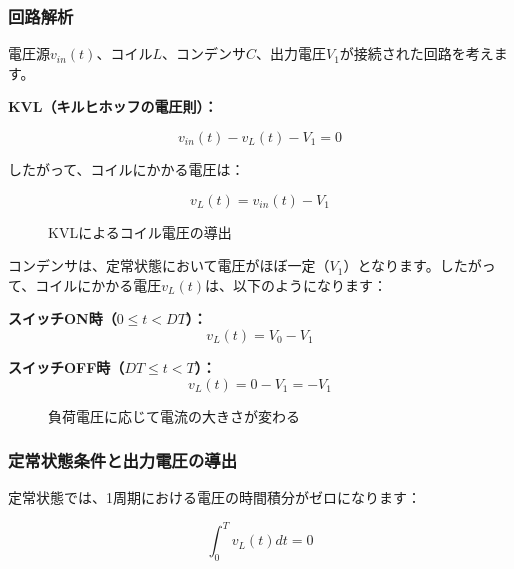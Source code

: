\subsubsection{回路解析}

電圧源$v_{in}(t)$、コイル$L$、コンデンサ$C$、出力電圧$V_1$が接続された回路を考えます。

\textbf{KVL（キルヒホッフの電圧則）：}

\begin{equation}
v_{in}(t) - v_L(t) - V_1 = 0
\end{equation}

したがって、コイルにかかる電圧は：

\begin{equation}
v_L(t) = v_{in}(t) - V_1
\end{equation}

\begin{figure}[H]
\centering
{}
\caption{KVLによるコイル電圧の導出}
\label{fig:ch04_inductor_load_kvl}
\end{figure}

コンデンサは、定常状態において電圧がほぼ一定（$V_1$）となります。したがって、コイルにかかる電圧$v_L(t)$は、以下のようになります：

\textbf{スイッチON時（$0 \leq t < DT$）：}
\begin{equation}
v_L(t) = V_0 - V_1
\end{equation}

\textbf{スイッチOFF時（$DT \leq t < T$）：}
\begin{equation}
v_L(t) = 0 - V_1 = -V_1
\end{equation}

\begin{figure}[H]
\centering
{}
\caption{負荷電圧に応じて電流の大きさが変わる}
\label{fig:ch04_inductor_load_voltage}
\end{figure}

\subsubsection{定常状態条件と出力電圧の導出}

定常状態では、1周期における電圧の時間積分がゼロになります：

\begin{equation}
\int_0^{T} v_L(t)dt = 0
\end{equation}

